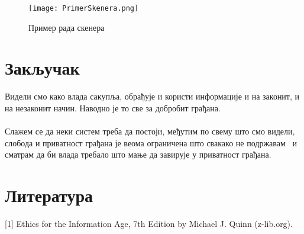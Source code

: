 \documentclass{article}
\begin{document}
\begin{figure}[h!]
\centering
\texttt{[image: PrimerSkenera.png]}
\caption{\label{fig:sangaj}Пример рада скенера}
\end{figure} 

\section{Закључак}
Видели смо како влада сакупља, обрађује и користи информације и на законит, и на незаконит начин. Наводно је то све за добробит грађана.
\\\\
Слажем се да неки систем треба да постоји, међутим по свему што смо видели, слобода и приватност грађана је веома ограничена што свакако не подржавам  и сматрам да би влада требало што мање да завирује у приватност грађана.

\newpage
\section{Литература}

 
[1] Ethics for the Information Age, 7th Edition by Michael J. Quinn (z-lib.org).
\end{document}
